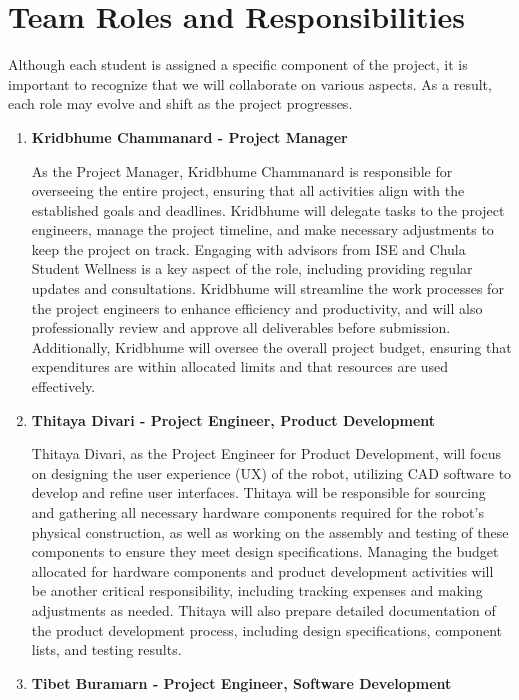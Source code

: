 \section{Team Roles and Responsibilities}

Although each student is assigned a specific component of the project, it is important to recognize that we will collaborate on various aspects. As a result, each role may evolve and shift as the project progresses.
\begin{enumerate}
    \item{\textbf{Kridbhume Chammanard - Project Manager}}
    
    As the Project Manager, Kridbhume Chammanard is responsible for overseeing the entire project, ensuring that all activities align with the established goals and deadlines. Kridbhume will delegate tasks to the project engineers, manage the project timeline, and make necessary adjustments to keep the project on track. Engaging with advisors from ISE and Chula Student Wellness is a key aspect of the role, including providing regular updates and consultations. Kridbhume will streamline the work processes for the project engineers to enhance efficiency and productivity, and will also professionally review and approve all deliverables before submission. Additionally, Kridbhume will oversee the overall project budget, ensuring that expenditures are within allocated limits and that resources are used effectively.
    
    \item{\textbf{Thitaya Divari - Project Engineer, Product Development}}
    
    Thitaya Divari, as the Project Engineer for Product Development, will focus on designing the user experience (UX) of the robot, utilizing CAD software to develop and refine user interfaces. Thitaya will be responsible for sourcing and gathering all necessary hardware components required for the robot’s physical construction, as well as working on the assembly and testing of these components to ensure they meet design specifications. Managing the budget allocated for hardware components and product development activities will be another critical responsibility, including tracking expenses and making adjustments as needed. Thitaya will also prepare detailed documentation of the product development process, including design specifications, component lists, and testing results.
    
    \item{\textbf{Tibet Buramarn - Project Engineer, Software Development}}
    

\end{enumerate}
